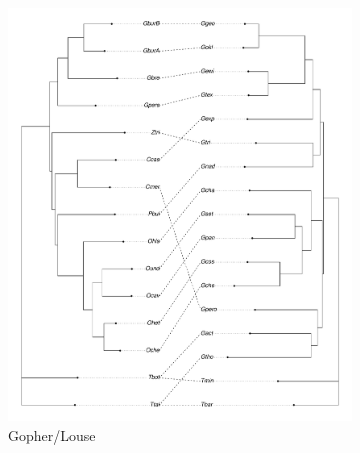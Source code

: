 
\begin{figure}
    \centering
    \begin{subfigure}[b]{0.45\textwidth}
        \includegraphics[width=\textwidth]{FishPoo/figures/codiv_gopher_louse}
        \small
        \caption{Gopher/Louse}
    \end{subfigure}
    \begin{subfigure}[b]{0.45\textwidth}

\end{subfigure}
\end{figure}
